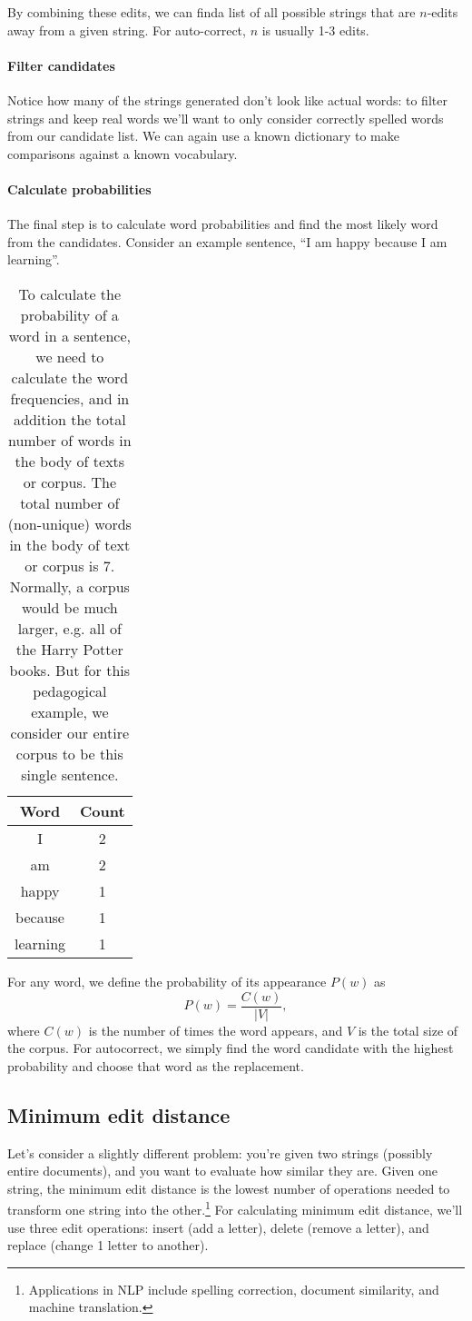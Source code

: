 \documentclass[12pt]{article}
\begin{document}
By combining these edits, we can finda list of all possible strings that are $n$-edits away from a given string. For auto-correct, $n$ is usually 1-3 edits.

\paragraph{Filter candidates} Notice how many of the strings generated don't look like actual words: to filter strings and keep real words we'll want to only consider correctly spelled words from our candidate list. We can again use a known dictionary to make comparisons against a known vocabulary.

\paragraph{Calculate probabilities} The final step is to calculate word probabilities and find the most likely word from the candidates. Consider an example sentence, ``I am happy because I am learning''.

\begin{table}[h]
  \begin{center}
  \begin{tabular}{c | c}
    \hline
    Word & Count \\
    \hline
    I & 2 \\
    am & 2 \\
    happy & 1 \\
    because & 1 \\
    learning & 1
  \end{tabular}
\caption{To calculate the probability of a word in a sentence, we need to calculate the word frequencies, and in addition the total number of words in the body of texts or corpus. The total number of (non-unique) words in the body of text or corpus is 7. Normally, a corpus would be much larger, e.g. all of the Harry Potter books. But for this pedagogical example, we consider our entire corpus to be this single sentence.}
\end{center}
\end{table}

For any word, we define the probability of its appearance $P(w)$ as
\[
P(w) = \frac{C(w)}{|V|},
\]
where $C(w)$ is the number of times the word appears, and $V$ is the total size of the corpus. For autocorrect, we simply find the word candidate with the highest probability and choose that word as the replacement.

\subsection{Minimum edit distance} Let's consider a slightly different problem: you're given two strings (possibly entire documents), and you want to evaluate how similar they are. Given one string, the minimum edit distance is the lowest number of operations needed to transform one string into the other.\footnote{Applications in NLP include spelling correction, document similarity, and machine translation.} For calculating minimum edit distance, we'll use three edit operations: insert (add a letter), delete (remove a letter), and replace (change 1 letter to another).
\end{document}
